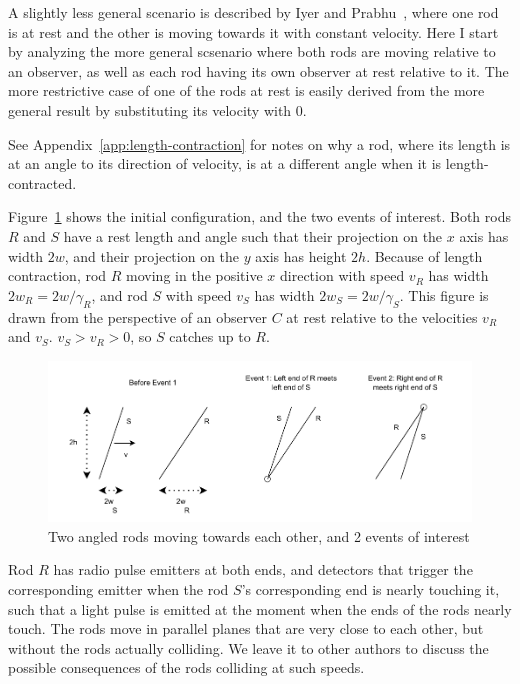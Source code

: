 \documentclass[a4paper]{article}
\theoremstyle{plain}
\theoremstyle{definition}
\begin{document}
A slightly less general scenario is described by Iyer and
Prabhu~\cite{IP2006}, where one rod is at rest and the other is moving
towards it with constant velocity.  Here I start by analyzing the more
general scsenario where both rods are moving relative to an observer,
as well as each rod having its own observer at rest relative to it.
The more restrictive case of one of the rods at rest is easily derived
from the more general result by substituting its velocity with 0.

See Appendix~\ref{app:length-contraction} for notes on why a rod,
where its length is at an angle to its direction of velocity, is at a
different angle when it is length-contracted.

Figure~\ref{fig:scenario-3b} shows the initial
configuration, and the two events of interest.  Both rods $R$ and $S$
have a rest length and angle such that their projection on the $x$
axis has width $2w$, and their projection on the $y$ axis has height
$2h$.  Because of length contraction, rod $R$ moving in the positive
$x$ direction with speed $v_R$ has width $2w_R = 2w/\gamma_R$, and rod
$S$ with speed $v_S$ has width $2w_S = 2w/\gamma_S$.  This figure is
drawn from the perspective of an observer $C$ at rest relative to the
velocities $v_R$ and $v_S$.  $v_S > v_R > 0$, so $S$ catches up to
$R$.
\begin{figure}[h!]
	\centering
	\includegraphics[width=1.0\textwidth]{scenario3b-events-cropped.pdf}
	\caption{Two angled rods moving towards each other, and 2 events of interest}
	\label{fig:scenario-3b}
\end{figure}

Rod $R$ has radio pulse emitters at both ends, and detectors that
trigger the corresponding emitter when the rod $S$'s corresponding end
is nearly touching it, such that a light pulse is emitted at the
moment when the ends of the rods nearly touch.  The rods move in
parallel planes that are very close to each other, but without the
rods actually colliding.  We leave it to other authors to discuss the
possible consequences of the rods colliding at such speeds.
\end{document}
